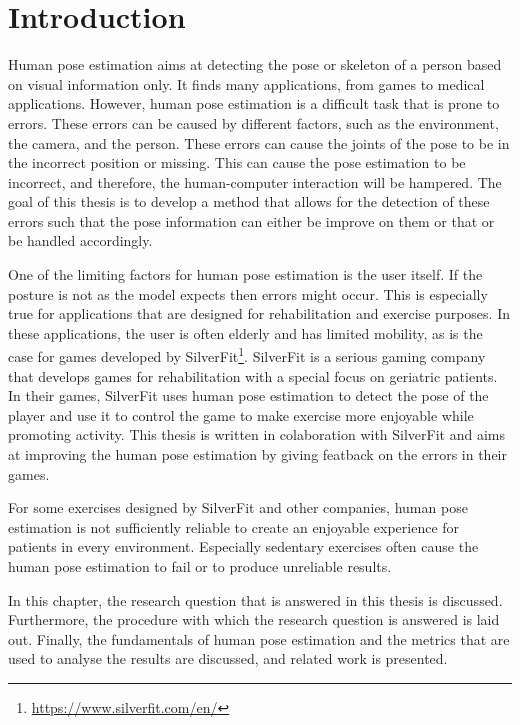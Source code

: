 \chapter{Introduction}
\setcounter{page}{1}
Human pose estimation aims at detecting the pose or skeleton of a person based on visual information only. It finds many applications, from games to medical applications\cite{kumarapu2020animepose, ClinicalApplicationChen, MedicalAnimation}. However, human pose estimation is a difficult task that is prone to errors\cite{HPEIsHard}. These errors can be caused by different factors, such as the environment, the camera, and the person. These errors can cause the joints of the pose to be in the incorrect position or missing. This can cause the pose estimation to be incorrect, and therefore, the human-computer interaction will be hampered. The goal of this thesis is to develop a method that allows for the detection of these errors such that the pose information can either be improve on them or that or be handled accordingly.

One of the limiting factors for human pose estimation is the user itself. If the posture is not as the model expects then errors might occur. This is especially true for applications that are designed for rehabilitation and exercise purposes. In these applications, the user is often elderly and has limited mobility, as is the case for games developed by SilverFit\footnote{\url{https://www.silverfit.com/en/}}. SilverFit is a serious gaming company that develops games for rehabilitation with a special focus on geriatric patients. In their games, SilverFit uses human pose estimation to detect the pose of the player and use it to control the game to make exercise more enjoyable while promoting activity. This thesis is written in colaboration with SilverFit and aims at improving the human pose estimation by giving featback on the errors in their games.

For some exercises designed by SilverFit and other companies, human pose estimation is not sufficiently reliable to create an enjoyable experience for patients in every environment. Especially sedentary exercises often cause the human pose estimation to fail or to produce unreliable results.

In this chapter, the research question that is answered in this thesis is discussed. Furthermore, the procedure with which the research question is answered is laid out. Finally, the fundamentals of human pose estimation and the metrics that are used to analyse the results are discussed, and related work is presented.


